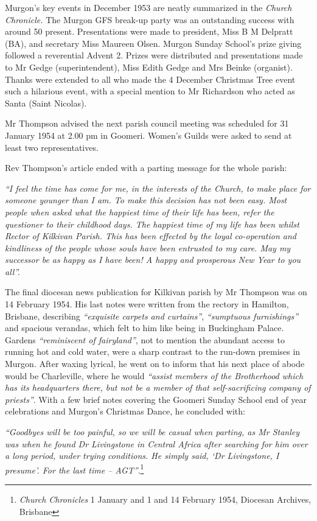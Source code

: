 Murgon's key events in December 1953 are neatly summarized in the \emph{Church Chronicle.} The Murgon GFS break-up party was an outstanding success with around 50 present. Presentations were made to president, Miss B M Delpratt (BA), and secretary Miss Maureen Olsen. Murgon Sunday School's prize giving followed a reverential Advent 2. Prizes were distributed and presentations made to Mr Gedge (superintendent), Miss Edith Gedge and Mrs Beinke (organist). Thanks were extended to all who made the 4 December Christmas Tree event such a hilarious event, with a special mention to Mr Richardson who acted as Santa (Saint Nicolas).

Mr Thompson advised the next parish council meeting was scheduled for 31 January 1954 at 2.00 pm in Goomeri. Women's Guilds were asked to send at least two representatives.

Rev Thompson's article ended with a parting message for the whole parish:

\emph{``I feel the time has come for me, in the interests of the Church, to make place for someone younger than I am. To make this decision has not been easy. Most people when asked what the happiest time of their life has been, refer the questioner to their childhood days. The happiest time of my life has been whilst Rector of Kilkivan Parish. This has been effected by the loyal co-operation and kindliness of the people whose souls have been entrusted to my care. May my successor be as happy as I have been! A happy and prosperous New Year to you all''.}

The final diocesan news publication for Kilkivan parish by Mr Thompson was on 14 February 1954. His last notes were written from the rectory in Hamilton, Brisbane, describing \emph{``exquisite carpets and curtains''}, \emph{``sumptuous furnishings''} and spacious verandas, which felt to him like being in Buckingham Palace. Gardens \emph{``reminiscent of fairyland''}, not to mention the abundant access to running hot and cold water, were a sharp contrast to the run-down premises in Murgon. After waxing lyrical, he went on to inform that his next place of abode would be Charleville, where he would \emph{``assist members of the Brotherhood which has its headquarters there, but not be a member of that self-sacrificing company of priests''}. With a few brief notes covering the Goomeri Sunday School end of year celebrations and Murgon's Christmas Dance, he concluded with:

\emph{``Goodbyes will be too painful, so we will be casual when parting, as Mr Stanley was when he found Dr Livingstone in Central Africa after searching for him over a long period, under trying conditions. He simply said, `Dr Livingstone, I presume'. For the last time -- AGT''}.\footnote{\emph{Church Chronicles} 1 January and 1 and 14 February 1954, Diocesan Archives, Brisbane}

